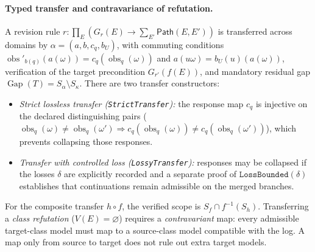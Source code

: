 \documentclass[11pt,a4paper]{article}
\theoremstyle{preprintthm}
\theoremstyle{preprintdef}
\newcommand{\obs}{\operatorname{obs}}
\newcommand{\Gap}{\operatorname{Gap}}
\begin{document}
\paragraph{Typed transfer and contravariance of refutation.}
A revision rule $r:\prod_E(G_r(E)\to\sum_{E'}\mathsf{Path}(E,E'))$ is transferred across domains by $\alpha=(a,b,c_q,b_U)$, with commuting conditions $\obs'_{b(q)}(a(\omega))=c_q(\obs_q(\omega))$ and $a(u\omega)=b_U(u)(a(\omega))$, verification of the target precondition $G_{r'}(f(E))$, and mandatory residual gap $\Gap(T)=S_\alpha\setminus S_\kappa$. There are two transfer constructors:
\begin{itemize}
  \item \emph{Strict lossless transfer (\texttt{StrictTransfer}):} the response map $c_q$ is injective on the declared distinguishing pairs ($\obs_q(\omega)\ne\obs_q(\omega')\Rightarrow c_q(\obs_q(\omega))\ne c_q(\obs_q(\omega'))$), which prevents collapsing those responses.
  \item \emph{Transfer with controlled loss (\texttt{LossyTransfer}):} responses may be collapsed if the losses $\delta$ are explicitly recorded and a separate proof of $\texttt{LossBounded}(\delta)$ establishes that continuations remain admissible on the merged branches.
\end{itemize}
For the composite transfer $h\circ f$, the verified scope is $S_f\cap f^{-1}(S_h)$. Transferring a \emph{class refutation} ($V(E)=\varnothing$) requires a \emph{contravariant} map: every admissible target-class model must map to a source-class model compatible with the log. A map only from source to target does not rule out extra target models.
\end{document}
